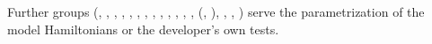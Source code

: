 \documentclass[letterpaper,10pt,english,openany,oneside]{sphinxmanual}
\begin{document}
\sphinxAtStartPar
Further groups (, , , , , , , , , , ,
, ,  (, ), , , ) serve the parametrization of
the model Hamiltonians or the developer’s own tests.
\end{document}

